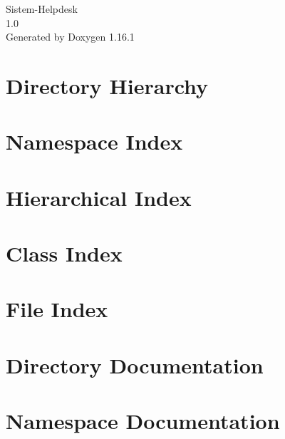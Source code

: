 \documentclass[twoside]{book}
\newcommand{\+}{\discretionary{\mbox{\scriptsize$\hookleftarrow$}}{}{}}
\newcommand{\clearemptydoublepage}{%
    \newpage{\pagestyle{empty}\cleardoublepage}%
  }
\begin{document}
  \raggedbottom
    \hypersetup{pageanchor=false,
                bookmarksnumbered=true,
                pdfencoding=unicode
               }
  \begin{titlepage}
  \vspace*{7cm}
  \begin{center}%
  {\Large Sistem-\/\+Helpdesk}\\
  [1ex]\large 1.\+0 \\
  \vspace*{1cm}
  {\large Generated by Doxygen 1.16.1}\\
  \end{center}
  \end{titlepage}
  \clearemptydoublepage
  \tableofcontents
  \clearemptydoublepage
  \hypersetup{pageanchor=true}
\chapter{Directory Hierarchy}

\chapter{Namespace Index}

\chapter{Hierarchical Index}

\chapter{Class Index}

\chapter{File Index}

\chapter{Directory Documentation}



\chapter{Namespace Documentation}

\end{document}
